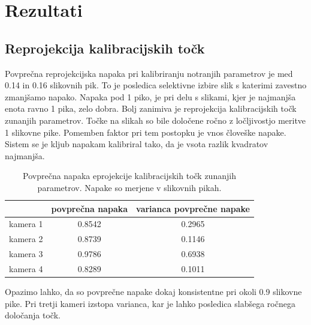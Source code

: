 \documentclass[a4paper, 12pt]{book}
\begin{document}

\chapter{Rezultati}
\section{Reprojekcija kalibracijskih točk}

Povprečna reprojekcijska napaka pri kalibriranju notranjih parametrov je med 0.14 in 0.16 slikovnih pik. To je posledica selektivne izbire slik s katerimi zavestno zmanjšamo napako. Napaka pod 1 piko, je pri delu s slikami, kjer je najmanjša enota ravno 1 pika, zelo dobra. Bolj zanimiva je reprojekcija kalibracijskih točk zunanjih parametrov. Točke na slikah so bile določene ročno z ločljivostjo meritve 1 slikovne pike. Pomemben faktor pri tem postopku je vnos človeške napake. Sistem se je kljub napakam kalibriral tako, da je vsota razlik kvadratov najmanjša. 

\begin{table}[H]
\centering
\begin{tabular}{| l | c | c |}
\hline
 & povprečna napaka & varianca povprečne napake \\
\hline
kamera 1 & 0.8542 & 0.2965 \\
kamera 2 & 0.8739 & 0.1146 \\
kamera 3 & 0.9786 & 0.6938 \\
kamera 4 & 0.8289 & 0.1011 \\
\hline
\end{tabular}
\caption{Povprečna napaka eprojekcije kalibracijskih točk zunanjih parametrov. Napake so merjene v slikovnih pikah.}
\label{pointpairs}
\end{table}

Opazimo lahko, da so povprečne napake dokaj konsistentne pri okoli 0.9 slikovne pike. Pri tretji kameri izstopa varianca, kar je lahko posledica slabšega ročnega določanja točk.
\end{document}
